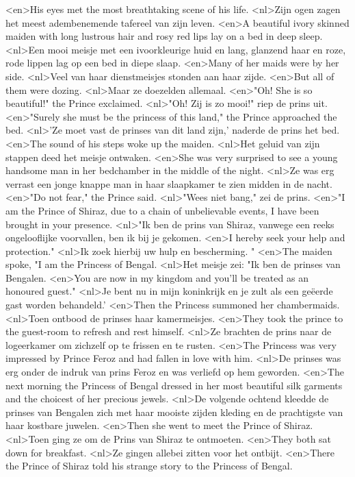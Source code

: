 <en>His eyes met the most breathtaking scene of his life.
<nl>Zijn ogen zagen het meest adembenemende tafereel van zijn leven.
<en>A beautiful ivory skinned maiden with long lustrous hair and rosy red lips lay on a bed in deep sleep.
<nl>Een mooi meisje met een ivoorkleurige huid en lang, glanzend haar en roze, rode lippen lag op een bed in diepe slaap.
<en>Many of her maids were by her side.
<nl>Veel van haar dienstmeisjes stonden aan haar zijde.
<en>But all of them were dozing.
<nl>Maar ze doezelden allemaal.
<en>"Oh! She is so beautiful!" the Prince exclaimed.
<nl>"Oh! Zij is zo mooi!" riep de prins uit.
<en>"Surely she must be the princess of this land," the Prince approached the bed.
<nl>'Ze moet vast de prinses van dit land zijn,' naderde de prins het bed.
<en>The sound of his steps woke up the maiden.
<nl>Het geluid van zijn stappen deed het meisje ontwaken.
<en>She was very surprised to see a young handsome man in her bedchamber in the middle of the night.
<nl>Ze was erg verrast een jonge knappe man  in haar slaapkamer te zien midden in de nacht.
<en>"Do not fear," the Prince said.
<nl>"Wees niet bang," zei de prins.
<en>"I am the Prince of Shiraz, due to a chain of unbelievable events, I have been brought in your presence.
<nl>"Ik ben de prins van Shiraz, vanwege een reeks ongelooflijke voorvallen, ben ik bij je gekomen.
<en>I hereby seek your help and protection."
<nl>Ik zoek hierbij uw hulp en bescherming. "
<en>The maiden spoke, "I am the Princess of Bengal.
<nl>Het meisje zei: "Ik ben de prinses van Bengalen.
<en>You are now in my kingdom and you'll be treated as an honoured guest."
<nl>Je bent nu in mijn koninkrijk en je zult als een geëerde gast worden behandeld.'
<en>Then the Princess summoned her chambermaids.
<nl>Toen ontbood de prinses haar kamermeisjes.
<en>They took the prince to the guest-room to refresh and rest himself.
<nl>Ze brachten de prins naar de logeerkamer om zichzelf op te frissen en te rusten.
<en>The Princess was very impressed by Prince Feroz and had fallen in love with him.
<nl>De prinses was erg onder de indruk van prins Feroz en was verliefd op hem geworden.
<en>The next morning the Princess of Bengal dressed in her most beautiful silk garments and the choicest of her precious jewels.
<nl>De volgende ochtend kleedde de prinses van Bengalen zich met haar mooiste zijden kleding en de prachtigste van haar kostbare juwelen.
<en>Then she went to meet the Prince of Shiraz.
<nl>Toen ging ze om de Prins van Shiraz te ontmoeten.
<en>They both sat down for breakfast.
<nl>Ze gingen allebei zitten voor het ontbijt.
<en>There the Prince of Shiraz told his strange story to the Princess of Bengal.
